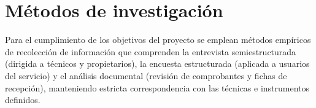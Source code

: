 \section{Métodos de investigación}

Para el cumplimiento de los objetivos del proyecto se emplean métodos empíricos de recolección de información que comprenden la entrevista semiestructurada (dirigida a técnicos y propietarios), la encuesta estructurada (aplicada a usuarios del servicio) y el análisis documental (revisión de comprobantes y fichas de recepción), manteniendo estricta correspondencia con las técnicas e instrumentos definidos.